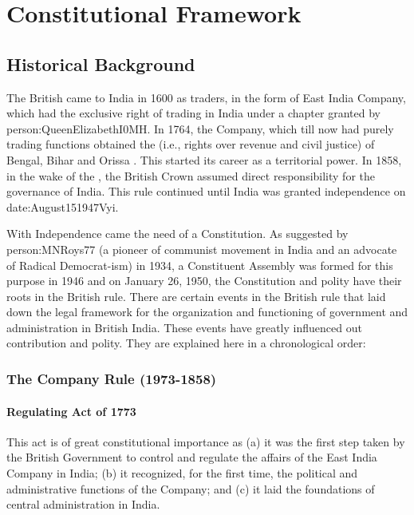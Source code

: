\thispagestyle{empty}
\part{Constitutional Framework}
\restoregeometry
\cleardoublepage

\twocolumn

\chapter{Historical Background}

The British came to India in 1600 as traders, in the form of East India Company, which had the exclusive right of trading in India under a chapter granted by \gls{person:QueenElizabethI0MH}. In 1764, the Company, which till now had purely trading functions obtained the \hspace{4pt}(i.e., rights over revenue and civil justice) of Bengal, Bihar and Orissa
. This started its career as a territorial power. In 1858, in the wake of the , the British Crown assumed direct responsibility for the governance of India. This rule continued until India was granted independence on \gls{date:August151947Vyi}.

With Independence came the need of a Constitution. As suggested by \gls{person:MNRoys77} (a pioneer of communist movement in India and an advocate of Radical Democrat-ism) in 1934, a Constituent Assembly was formed for this purpose in 1946 and on January 26, 1950, the Constitution and polity have their roots in the British rule. There are certain events in the British rule that laid down the legal framework for the organization and functioning of government and administration in British India. These events have greatly influenced out contribution and polity. They are explained here in a chronological order:

\section{The Company Rule (1973-1858)}

\subsection{Regulating Act of 1773}
This act is of great constitutional importance as (a) it was the first step taken by the British Government to control and regulate the affairs of the East India Company in India; (b) it recognized, for the first time, the political and administrative functions of the Company; and (c) it laid the foundations of central administration in India.

